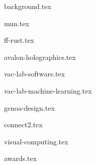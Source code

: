 \documentclass[11pt]{article}
\begin{document}
{background.tex}


{mun.tex}


{ff-rust.tex}

{avalon-holographics.tex}

{vac-lab-software.tex}

{vac-lab-machine-learning.tex}

{genoa-design.tex}


{connect2.tex}

{visual-computing.tex}


{awards.tex}
\end{document}
